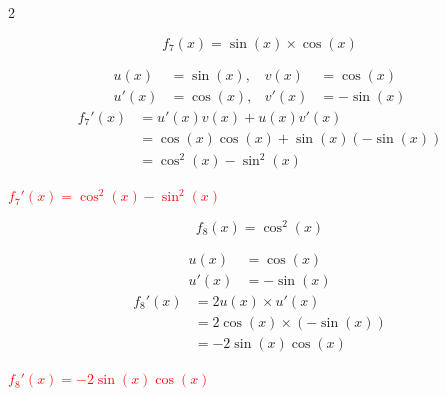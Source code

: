 \documentclass[11pt,a4paper]{article}
\begin{document}
\vfill 

\begin{multicols}{2}
\begin{tcolorbox}[colback=red!5!white,colframe=red!75!black]
{

\vspace{4mm}

\[
f_7(x) = \sin(x) \times \cos(x)
\]

\vspace{4mm}


\[
\begin{aligned}
u(x) &= \sin(x), & v(x) &= \cos(x) \\
u'(x) &= \cos(x), & v'(x) &= -\sin(x)
\end{aligned}
\]
\vspace{4mm}
\[
\begin{aligned}
    f_7'(x) & = u'(x)v(x) + u(x)v'(x)  \\[2mm]
            & = \cos(x)\cos(x) + \sin(x)(-\sin(x)) \\[2mm]
            & = \cos^2(x) - \sin^2(x)
\end{aligned}
\]
\vspace{6mm}
\begin{center}
\textbf{\textcolor{red}{$f_7'(x) = \cos^2(x) - \sin^2(x)$}}
\end{center}
\vspace{13mm}
}
\end{tcolorbox}

\begin{tcolorbox}[colback=red!5!white,colframe=red!75!black]
{

\vspace{4mm}

\[
f_8(x) = \cos^2(x)
\]

\vspace{4mm}


\[
\begin{aligned}
u(x) &= \cos(x) \\
u'(x) &= -\sin(x)
\end{aligned}
\]
\vspace{4mm}
\[
\begin{aligned}
    f_8'(x) & = 2u(x) \times u'(x)  \\[2mm]
            & = 2\cos(x) \times (-\sin(x)) \\[2mm]
            & = -2\sin(x)\cos(x)
\end{aligned}
\]
\vspace{6mm}
\begin{center}
\textbf{\textcolor{red}{$f_8'(x) = -2\sin(x)\cos(x)$}}
\end{center}
\vspace{13mm}
}
\end{tcolorbox}
\end{multicols}
\end{document}
